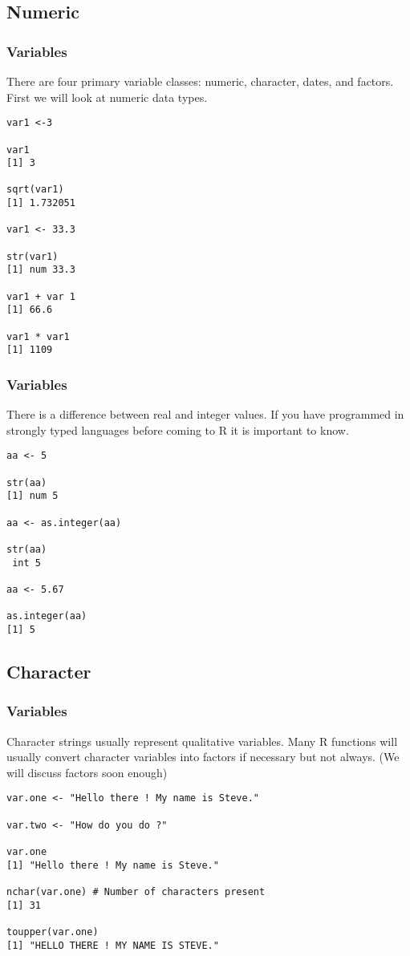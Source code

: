 \documentclass{beamer}
\begin{document}

\subsection{Numeric}
\begin{frame}[fragile]
\frametitle{Variables}
There are four primary variable classes: numeric, character, dates, and factors. First we will look at numeric data types.

\scriptsize

\begin{verbatim}
var1 <-3

var1
[1] 3

sqrt(var1)
[1] 1.732051

var1 <- 33.3

str(var1)
[1] num 33.3

var1 + var 1
[1] 66.6

var1 * var1
[1] 1109

\end{verbatim}
\end{frame}

\begin{frame}[fragile]
\frametitle{Variables}
There is a difference between real and integer values. If you have programmed in strongly typed languages before coming to R it is important to know.

\small

\begin{verbatim}
aa <- 5

str(aa)
[1] num 5
 
aa <- as.integer(aa)

str(aa)
 int 5

aa <- 5.67

as.integer(aa)
[1] 5
\end{verbatim}
\end{frame}

\subsection{Character}
\begin{frame}[fragile]
\frametitle{Variables}
Character strings usually represent qualitative variables. Many R functions will usually convert character variables into factors if necessary but not always. (We will discuss factors soon enough) 
 

\footnotesize
\begin{verbatim}
var.one <- "Hello there ! My name is Steve."

var.two <- "How do you do ?"

var.one
[1] "Hello there ! My name is Steve."

nchar(var.one) # Number of characters present
[1] 31

toupper(var.one)
[1] "HELLO THERE ! MY NAME IS STEVE."

\end{verbatim}
\end{frame}
\end{document}
